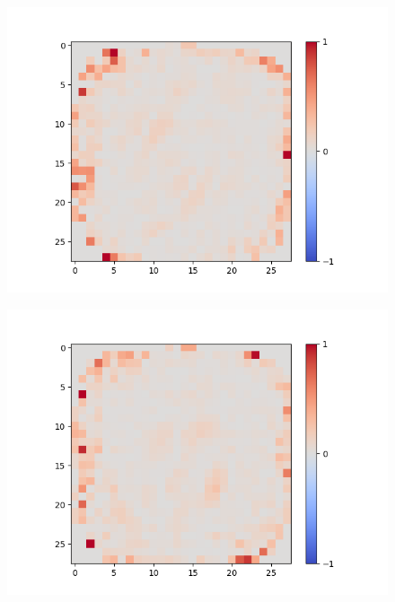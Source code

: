 \begin{figure}[H]
	\centering
	\begin{minipage}[b]{0.19\textwidth}
		\captionsetup{labelformat=empty}
		\includegraphics[width=\textwidth]{Linear-AE/Feature-3.png}
		\label{}
	\end{minipage}
	\begin{minipage}[b]{0.19\textwidth}
		\captionsetup{labelformat=empty}
		\includegraphics[width=\textwidth]{Linear-AE/Feature-7.png}
		\label{}
	\end{minipage}
	\begin{minipage}[b]{0.19\textwidth}
		\captionsetup{labelformat=empty}

\end{minipage}
\end{figure}
